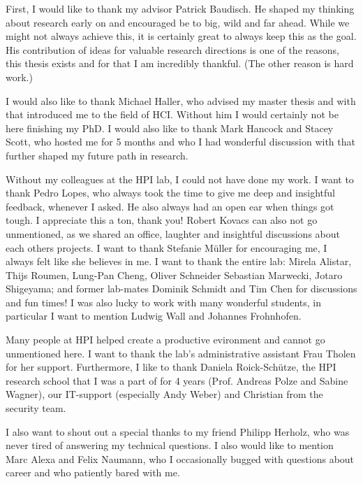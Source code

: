 

First, I would like to thank my advisor Patrick Baudisch. He shaped my thinking about research early on and encouraged be to big, wild and far ahead. While we might not always achieve this, it is certainly great to always keep this as the goal. His contribution of ideas for valuable research directions is one of the reasons, this thesis exists and for that I am incredibly thankful. (The other reason is hard work.)

I would also like to thank Michael Haller, who advised my master thesis and with that introduced me to the field of HCI. Without him I would certainly not be here finishing my PhD. I would also like to thank Mark Hancock and Stacey Scott, who hosted me for 5 months and who I had wonderful discussion with that further shaped my future path in research. 

Without my colleagues at the HPI lab, I could not have done my work. I want to thank Pedro Lopes, who always took the time to give me deep and insightful feedback, whenever I asked. He also always had an open ear when things got tough. I appreciate this a ton, thank you! Robert Kovacs can also not go unmentioned, as we shared an office, laughter and insightful discussions about each others projects. I want to thank Stefanie Müller for encouraging me, I always felt like she believes in me. I want to thank the entire lab: Mirela Alistar, Thijs Roumen, Lung-Pan Cheng, Oliver Schneider Sebastian Marwecki, Jotaro Shigeyama; and former lab-mates Dominik Schmidt and Tim Chen for discussions and fun times! I was also lucky to work with many wonderful students, in particular I want to mention Ludwig Wall and Johannes Frohnhofen.

Many people at HPI helped create a productive evironment and cannot go unmentioned here. I want to thank the lab's administrative assistant Frau Tholen for her support. Furthermore, I like to thank Daniela Roick-Schütze, the HPI research school that I was a part of for 4 years (Prof. Andreas Polze and Sabine Wagner), our IT-support (especially Andy Weber) and Christian from the security team.

I also want to shout out a special thanks to my friend Philipp Herholz, who was never tired of answering my technical questions. I also would like to mention Marc Alexa and Felix Naumann, who I occasionally bugged with questions about career and who patiently bared with me. 

